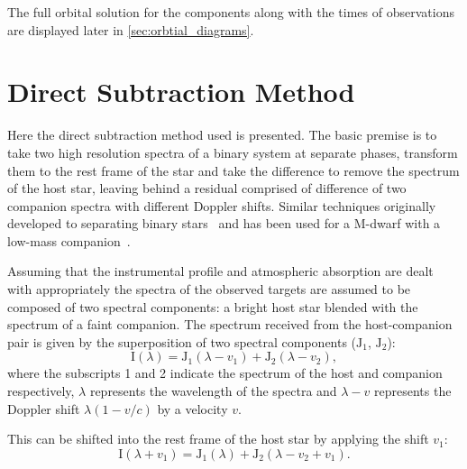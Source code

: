

The full orbital solution for the components along with the times of observations are displayed later in \cref{sec:orbtial_diagrams}.


\section{Direct Subtraction Method}
\label{sec:direct-subtraction}
Here the direct subtraction method used is presented.
The basic premise is to take two high resolution spectra of a binary system at separate phases, transform them to the rest frame of the star and take the difference to remove the spectrum of the host star, leaving behind a residual comprised of difference of two companion spectra with different Doppler shifts.
Similar techniques originally developed to separating binary stars~\citep{ferluga_separating_1997} and has been used for a M-dwarf with a low-mass companion~\citep[e.g.][]{kostogryz_spectral_2013}.

Assuming that the instrumental profile and atmospheric absorption are dealt with appropriately the spectra of the observed targets are assumed to be composed of two spectral components:
a bright host star blended with the spectrum of a faint companion.
The spectrum received from the host-companion pair is given by the superposition of two spectral components (\(\textrm{J}_{1}\), \(\textrm{J}_{2}\)):
\begin{equation}
\textrm{I}(\lambda) = \textrm{J}_{1}(\lambda - v_{1}) + \textrm{J}_{2}(\lambda - v_{2}),
\end{equation}
where the subscripts 1 and 2 indicate the spectrum of the host and companion respectively, \(\lambda\) represents the wavelength of the spectra and \(\lambda-v\) represents the Doppler shift \(\lambda(1-v/c)\) by a velocity \(v\).

This can be shifted into the rest frame of the host star by applying the shift \(v_1\):
\begin{equation}
\textrm{I}(\lambda + v_{1}) = \textrm{J}_{1}(\lambda) + \textrm{J}_{2}(\lambda - v_{2} + v_{1}).
\end{equation}

